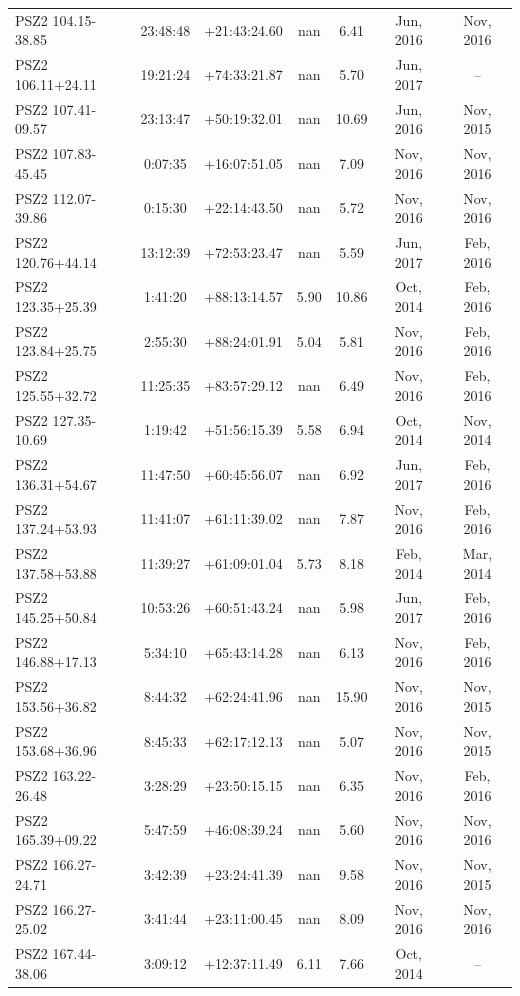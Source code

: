\documentclass[apj, revtex4]{emulateapj}
\begin{document}
\begin{longtable*}{lcccccc}
PSZ2 104.15-38.85 & 23:48:48 & +21:43:24.60 & nan & 6.41 & Jun, 2016 & Nov, 2016\\
PSZ2 106.11+24.11 & 19:21:24 & +74:33:21.87 & nan & 5.70 & Jun, 2017 & --\\
PSZ2 107.41-09.57 & 23:13:47 & +50:19:32.01 & nan & 10.69 & Jun, 2016 & Nov, 2015\\
PSZ2 107.83-45.45 & 0:07:35 & +16:07:51.05 & nan & 7.09 & Nov, 2016 & Nov, 2016\\
PSZ2 112.07-39.86 & 0:15:30 & +22:14:43.50 & nan & 5.72 & Nov, 2016 & Nov, 2016\\
PSZ2 120.76+44.14 & 13:12:39 & +72:53:23.47 & nan & 5.59 & Jun, 2017 & Feb, 2016\\
PSZ2 123.35+25.39 & 1:41:20 & +88:13:14.57 & 5.90 & 10.86 & Oct, 2014 & Feb, 2016\\
PSZ2 123.84+25.75 & 2:55:30 & +88:24:01.91 & 5.04 & 5.81 & Nov, 2016 & Feb, 2016\\
PSZ2 125.55+32.72 & 11:25:35 & +83:57:29.12 & nan & 6.49 & Nov, 2016 & Feb, 2016\\
PSZ2 127.35-10.69 & 1:19:42 & +51:56:15.39 & 5.58 & 6.94 & Oct, 2014 & Nov, 2014\\
PSZ2 136.31+54.67 & 11:47:50 & +60:45:56.07 & nan & 6.92 & Jun, 2017 & Feb, 2016\\
PSZ2 137.24+53.93 & 11:41:07 & +61:11:39.02 & nan & 7.87 & Nov, 2016 & Feb, 2016\\
PSZ2 137.58+53.88 & 11:39:27 & +61:09:01.04 & 5.73 & 8.18 & Feb, 2014 & Mar, 2014\\
PSZ2 145.25+50.84 & 10:53:26 & +60:51:43.24 & nan & 5.98 & Jun, 2017 & Feb, 2016\\
PSZ2 146.88+17.13 & 5:34:10 & +65:43:14.28 & nan & 6.13 & Nov, 2016 & Feb, 2016\\
PSZ2 153.56+36.82 & 8:44:32 & +62:24:41.96 & nan & 15.90 & Nov, 2016 & Nov, 2015\\
PSZ2 153.68+36.96 & 8:45:33 & +62:17:12.13 & nan & 5.07 & Nov, 2016 & Nov, 2015\\
PSZ2 163.22-26.48 & 3:28:29 & +23:50:15.15 & nan & 6.35 & Nov, 2016 & Feb, 2016\\
PSZ2 165.39+09.22 & 5:47:59 & +46:08:39.24 & nan & 5.60 & Nov, 2016 & Nov, 2016\\
PSZ2 166.27-24.71 & 3:42:39 & +23:24:41.39 & nan & 9.58 & Nov, 2016 & Nov, 2015\\
PSZ2 166.27-25.02 & 3:41:44 & +23:11:00.45 & nan & 8.09 & Nov, 2016 & Nov, 2016\\
PSZ2 167.44-38.06 & 3:09:12 & +12:37:11.49 & 6.11 & 7.66 & Oct, 2014 & --\\

\end{longtable*}
\end{document}
